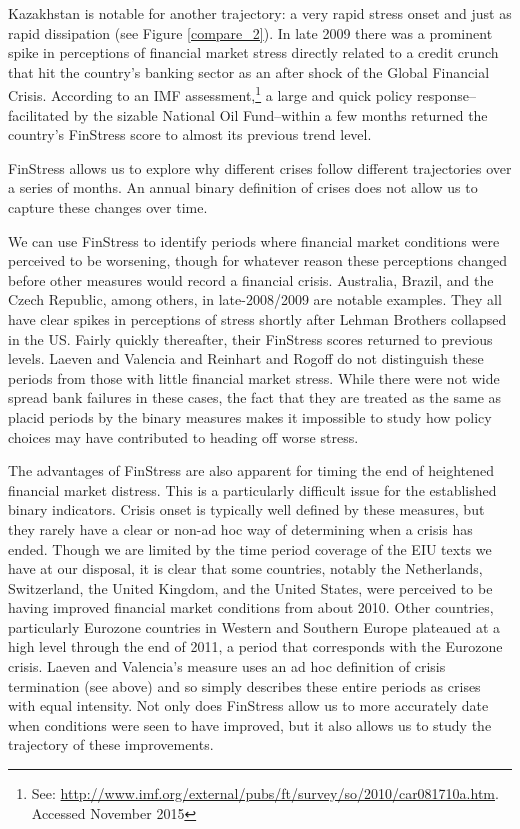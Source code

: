 \documentclass[]{article}
\begin{document}
Kazakhstan is notable for another trajectory: a very rapid stress onset and just as rapid dissipation (see Figure \ref{compare_2}). In late 2009 there was a prominent spike in perceptions of financial market stress directly related to a credit crunch that hit the country's banking sector as an after shock of the Global Financial Crisis. According to an IMF assessment,\footnote{See: \url{http://www.imf.org/external/pubs/ft/survey/so/2010/car081710a.htm}. Accessed November 2015} a large and quick policy response--facilitated by the sizable National Oil Fund--within a few months returned the country's FinStress score to almost its previous trend level.

FinStress allows us to explore why different crises follow different trajectories over a series of months. An annual binary definition of crises does not allow us to capture these changes over time.

We can use FinStress to identify periods where financial market conditions were perceived to be worsening, though for whatever reason these perceptions changed before other measures would record a financial crisis. Australia, Brazil, and the Czech Republic, among others, in late-2008/2009 are notable examples. They all have clear spikes in perceptions of stress shortly after Lehman Brothers collapsed in the US. Fairly quickly thereafter, their FinStress scores returned to previous levels. Laeven and Valencia and Reinhart and Rogoff do not distinguish these periods from those with little financial market stress. While there were not wide spread bank failures in these cases, the fact that they are treated as the same as placid periods by the binary measures makes it impossible to study how policy choices may have contributed to heading off worse stress.

The advantages of FinStress are also apparent for timing the end of heightened financial market distress. This is a particularly difficult issue for the established binary indicators. Crisis onset is typically well defined by these measures, but they rarely have a clear or non-ad hoc way of determining when a crisis has ended. Though we are limited by the time period coverage of the EIU texts we have at our disposal, it is clear that some countries, notably the Netherlands, Switzerland, the United Kingdom, and the United States, were perceived to be having improved financial market conditions from about 2010. Other countries, particularly Eurozone countries in Western and Southern Europe plateaued at a high level through the end of 2011, a period that corresponds with the Eurozone crisis. Laeven and Valencia's measure uses an ad hoc definition of crisis termination (see above) and so simply describes these entire periods as crises with equal intensity. Not only does FinStress allow us to more accurately date when conditions were seen to have improved, but it also allows us to study the trajectory of these improvements.
\end{document}
